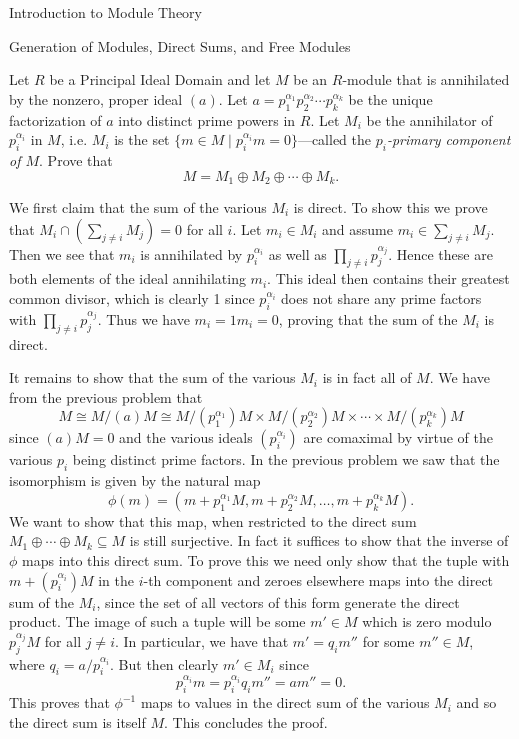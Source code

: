 \begin{chapter}{Introduction to Module Theory}
\begin{section}{Generation of Modules, Direct Sums, and Free Modules}
\begin{problem}\label{ex:10.3.18}
Let $R$ be a Principal Ideal Domain and let $M$ be an $R$-module that is annihilated by the nonzero, proper ideal $(a)$. Let $a = p_1^{\alpha_1}p_2^{\alpha_2}\cdots p_k^{\alpha_k}$ be the unique factorization of $a$ into distinct prime powers in $R$. Let $M_i$ be the annihilator of $p_i^{\alpha_i}$ in $M$, i.e. $M_i$ is the set $\{m\in M\mid p_i^{\alpha_i}m = 0\}$---called the \emph{$p_i$-primary component of $M$}. Prove that \[
M = M_1\oplus M_2\oplus \cdots \oplus M_k.
\]
\end{problem}
\begin{solution}
 We first claim that the sum of the various $M_i$ is direct. To show this we prove that $M_i\cap (\sum_{j\neq i} M_j) = 0$ for all $i$. Let $m_i\in M_i$ and assume $m_i\in \sum_{j\neq i} M_j$. Then we see that $m_i$ is annihilated by $p_i^{\alpha_i}$ as well as $\prod_{j\neq i} p_j^{\alpha_j}$. Hence these are both elements of the ideal annihilating $m_i$. This ideal then contains their greatest common divisor, which is clearly 1 since $p_i^{\alpha_i}$ does not share any prime factors with $\prod_{j\neq i} p_j^{\alpha_j}$. Thus we have $m_i = 1m_i = 0$, proving that the sum of the $M_i$ is direct. 
 
 

It remains to show that the sum of the various $M_i$ is in fact all of $M$. We have from the previous problem that \[
M\cong M/(a)M \cong M/(p_1^{\alpha_1})M \times M/(p_2^{\alpha_2})M\times\cdots\times M/(p_k^{\alpha_k})M
\]
since $(a)M = 0$ and the various ideals $(p_i^{\alpha_i})$ are comaximal by virtue of the various $p_i$ being distinct prime factors. In the previous problem we saw that the isomorphism is given by the natural map \[\phi(m) = (m+p_1^{\alpha_1}M, m+p_2^{\alpha_2}M,\ldots, m+p_k^{\alpha_k}M).\]
We want to show that this map, when restricted to the direct sum $M_1\oplus\cdots \oplus M_k\subseteq M$ is still surjective. In fact it suffices to show that the inverse of $\phi$ maps into this direct sum. To prove this we need only show that the tuple with $m+(p_i^{\alpha_i})M$ in the $i$-th component and zeroes elsewhere maps into the direct sum of the $M_i$, since the set of all vectors of this form generate the direct product. The image of such a tuple will be some $m'\in M$ which is zero modulo $p_j^{\alpha_j}M$ for all $j\neq i$. In particular, we have that $m' =q_i m''$ for some $m''\in M$, where $q_i = a/p_i^{\alpha_i}$. But then clearly $m'\in M_i$ since \[
p_i^{\alpha_i} m = p_i^{\alpha_i}q_i m'' = am'' = 0.
\]
This proves that $\phi^{-1}$ maps to values in the direct sum of the various $M_i$ and so the direct sum is itself $M$. This concludes the proof.


\end{solution}
\end{section}
\end{chapter}
